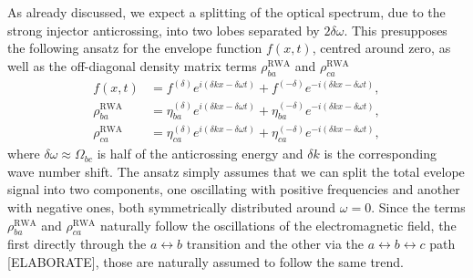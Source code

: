 \documentclass[journal]{IEEEtran}
\begin{document}
As already discussed, we expect a splitting of the optical spectrum, due to the strong injector anticrossing, into two lobes separated by $2\delta\omega$. This presupposes the following ansatz for the envelope function $f(x,t)$, centred around zero, as well as the off-diagonal density matrix terms $\rho^{\text{RWA}}_{ba}$ and $\rho^{\text{RWA}}_{ca}$
\begin{subequations}
		\label{eq:field_ansatz}
	\begin{align}
	f(x,t) &= f^{(\delta)}e^{i(\delta k x - \delta\omega t)} + f^{(-\delta)}e^{-i(\delta k x - \delta\omega t)}, \\
	\rho^{\text{RWA}}_{ba} &= \eta_{ba}^{(\delta)}e^{i(\delta k x - \delta\omega t)} + \eta_{ba}^{(-\delta)}e^{-i(\delta k x - \delta\omega t)}, \\
	\rho^{\text{RWA}}_{ca}&= \eta_{ca}^{(\delta)}e^{i(\delta k x - \delta\omega t)} + \eta_{ca}^{(-\delta)}e^{-i(\delta k x - \delta\omega t)}, 
	\end{align}
\end{subequations}
where $\delta\omega\approx \Omega_{bc}$  is half of the anticrossing energy and $\delta k$ is the corresponding wave number shift. The ansatz simply assumes that we can split the total evelope signal into two components, one oscillating with positive frequencies and another with negative ones, both symmetrically distributed around $\omega = 0$. Since the terms $\rho^{\text{RWA}}_{ba}$ and $\rho^{\text{RWA}}_{ca}$ naturally follow the oscillations of the electromagnetic field, the first directly through the $a \leftrightarrow b$ transition and the other via the $a \leftrightarrow b \leftrightarrow c$ path [ELABORATE], those are naturally assumed to follow the same trend.
\end{document}
